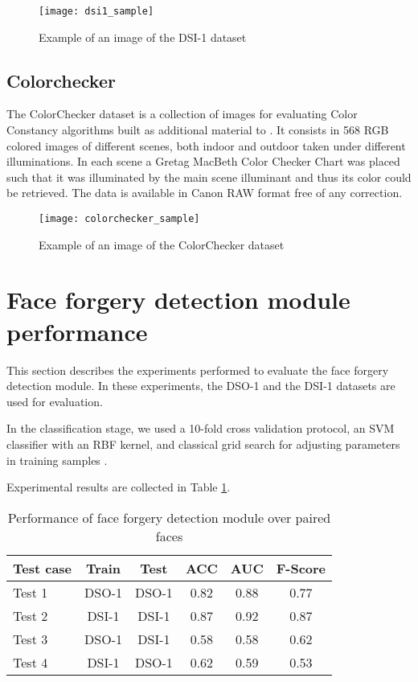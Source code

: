 \begin{figure}[h!]
  \centering
    \texttt{[image: dsi1\_sample]}
    \caption{Example of an image of the DSI-1 dataset}
    \label{fig:dsisample}
\end{figure}

\subsection{Colorchecker}

The ColorChecker dataset is a collection of images for evaluating Color Constancy algorithms built as additional material to \cite{gehler2008bayesian}. It consists in 568 RGB colored images of different scenes, both indoor and outdoor taken under different illuminations. In each scene a Gretag MacBeth Color Checker Chart was placed such that it was illuminated by the main scene illuminant and thus its color could be retrieved. The data is available in Canon RAW format free of any correction.

\begin{figure}[h!]
  \centering
    \texttt{[image: colorchecker\_sample]}
    \caption{Example of an image of the ColorChecker dataset}
    \label{fig:colorcheckersample}
\end{figure}

\section{Face forgery detection module performance}

This section describes the experiments performed to evaluate the face forgery detection module. In these experiments, the DSO-1 and the DSI-1 datasets are used for evaluation.

In the classification stage, we used a 10-fold cross validation protocol, an SVM classifier with an RBF
kernel, and classical grid search for adjusting parameters in training samples \cite{bishop2007pattern}.

Experimental results are collected in Table \ref{table:performancefacedet}. 

\begin{table}[h!]
\caption{Performance of face forgery detection module over paired faces}
\label{table:performancefacedet}
\centering
\small
\begin{tabular}{l c c c c c} 
\hline \hline 
Test case & Train & Test & ACC & AUC & F-Score \\ [0.5ex]
\hline
Test 1 & DSO-1 & DSO-1 &	0.82 & 0.88	& 0.77\\
Test 2 & DSI-1 & DSI-1 &	0.87 & 0.92 & 0.87\\
Test 3 &	DSO-1 &	DSI-1 &	0.58 & 0.58 & 0.62\\
Test 4 &	DSI-1 & DSO-1 & 0.62 & 0.59 & 0.53\\ [1ex]
\hline
\end{tabular}
\end{table}


